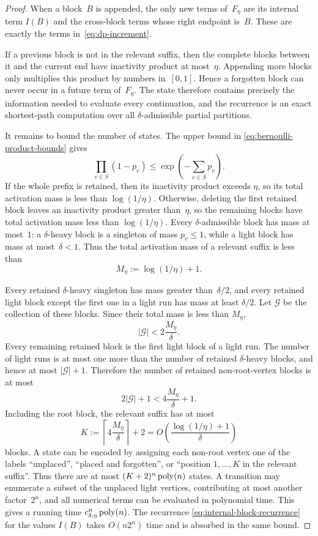 \documentclass[12pt,a4paper,oneside]{report}
\begin{document}
\begin{proof}
When a block~$B$ is appended, the only new terms of~$F_\eta$ are its internal
term $I(B)$ and the cross-block terms whose right endpoint is~$B$.  These are
exactly the terms in~\cref{eq:dp-increment}.

If a previous block is not in the relevant suffix, then the complete blocks
between it and the current end have inactivity product at most~$\eta$.
Appending more blocks only multiplies this product by numbers in~$[0,1]$.
Hence a forgotten block can never occur in a future term of~$F_\eta$.  The
state therefore contains precisely the information needed to evaluate every
continuation, and the recurrence is an exact shortest-path computation over all
$\delta$-admissible partial partitions.

It remains to bound the number of states.  The upper bound in
\cref{eq:bernoulli-product-bounds} gives
\[
    \prod_{v\in S}(1-p_v)
    \le \exp\left(-\sum_{v\in S}p_v\right).
\]
If the whole prefix is retained, then its inactivity product exceeds
$\eta$, so its total activation mass is less than
$\log(1/\eta)$.  Otherwise, deleting the first retained block leaves an
inactivity product greater than~$\eta$, so the remaining blocks have total
activation mass less than $\log(1/\eta)$.  Every $\delta$-admissible block has mass at
most~$1$: a $\delta$-heavy block is a singleton of mass $p_v\le1$, while a light block
has mass at most~$\delta<1$.  Thus the total activation mass of a relevant
suffix is less than
\[
    M_\eta:=\log(1/\eta)+1.
\]

Every retained $\delta$-heavy singleton has mass greater than~$\delta/2$, and every
retained light block except the first one in a light run has mass at least
$\delta/2$.  Let $\mathcal G$ be the collection of these blocks.  Since their
total mass is less than $M_\eta$,
\[
    |\mathcal G|<2\frac{M_\eta}{\delta}.
\]
Every remaining retained block is the first light block of a light run.  The
number of light runs is at most one more than the number of retained $\delta$-heavy
blocks, and hence at most $|\mathcal G|+1$.  Therefore the number of retained
non-root-vertex blocks is at most
\[
    2|\mathcal G|+1
    <4\frac{M_\eta}{\delta}+1.
\]
Including the root block, the relevant suffix has at most
\[
    K:=\left\lceil4\frac{M_\eta}{\delta}\right\rceil+2
    =O\!\left(\frac{\log(1/\eta)+1}{\delta}\right)
\]
blocks.  A state can be encoded by assigning each non-root vertex one of the labels
``unplaced'', ``placed and forgotten'', or ``position $1,\dots,K$ in the
relevant suffix''.  Thus there are at most $(K+2)^n\operatorname{poly}(n)$ states.  A
transition may enumerate a subset of the unplaced light vertices, contributing
at most another factor~$2^n$, and all numerical terms can be evaluated in
polynomial time.  This gives a running time
$c_{\delta,\eta}^n\operatorname{poly}(n)$.  The recurrence
\cref{eq:internal-block-recurrence} for the values $I(B)$ takes
$O(n2^n)$ time and is absorbed in the same bound.
\end{proof}
\end{document}
